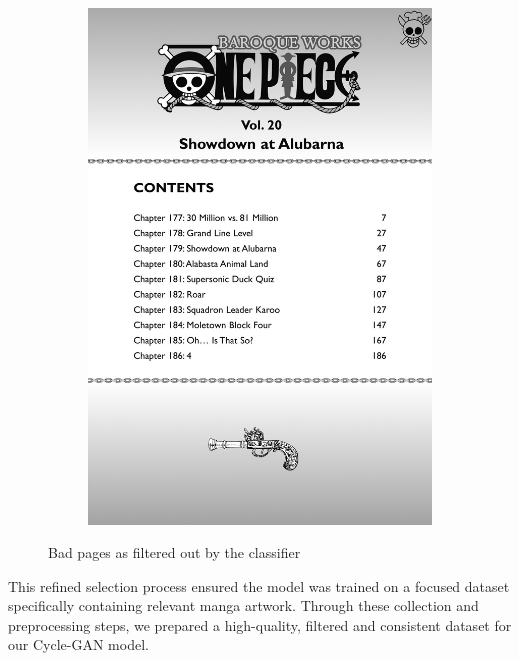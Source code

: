 \begin{figure}[htbp]
\begin{subfigure}[b]{0.2\textwidth}
    \end{subfigure}
    \hfill
    \begin{subfigure}[b]{0.25\textwidth}
        \includegraphics[width=\textwidth]{chapter/output/bad59.png}

    \end{subfigure}
    
    \caption{Bad pages as filtered out by the classifier}
    \label{fig:bad_images}
    
\end{figure}


This refined selection process ensured the model was trained on a focused dataset specifically containing relevant manga artwork. Through these collection and preprocessing steps, we prepared a high-quality, filtered and consistent dataset for our Cycle-GAN model.
\newpage

